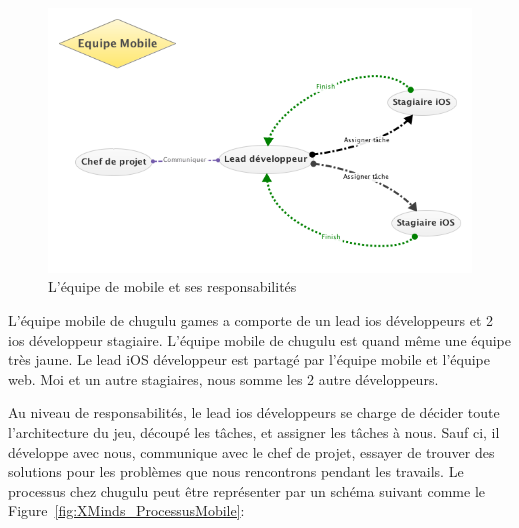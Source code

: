 \begin{figure}[htbp]
	\centering
		\includegraphics[width=6in]{XMinds/EquipeMobile.png}
	\caption{L'équipe de mobile et ses responsabilités}
	\label{fig:XMinds_EquipeMobile}
\end{figure}


L'équipe mobile de chugulu games a comporte de un lead ios développeurs et 2 ios développeur stagiaire. L'équipe mobile de chugulu est quand même une équipe très jaune. Le lead iOS développeur est partagé par l'équipe mobile et l'équipe web. Moi et un autre stagiaires, nous somme les 2 autre développeurs. 

Au niveau de responsabilités, le lead ios développeurs se charge de décider toute l'architecture du jeu, découpé les tâches, et assigner les tâches à nous. Sauf ci, il développe avec nous, communique avec le chef de projet, essayer de trouver des solutions pour les problèmes que nous rencontrons pendant les travails. Le processus chez chugulu peut être représenter par un schéma suivant comme le Figure~\ref{fig:XMinds_ProcessusMobile}:

